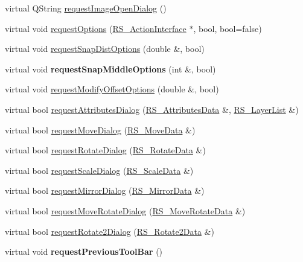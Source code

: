 \begin{DoxyCompactItemize}
\item 
virtual Q\-String \hyperlink{classRS__DialogFactoryAdapter_a6a8b801ae386148a8334aadc9cd93bf0}{request\-Image\-Open\-Dialog} ()
\item 
virtual void \hyperlink{classRS__DialogFactoryAdapter_a333c5316e39ba598f785b0fdbf70a197}{request\-Options} (\hyperlink{classRS__ActionInterface}{R\-S\-\_\-\-Action\-Interface} $\ast$, bool, bool=false)
\item 
virtual void \hyperlink{classRS__DialogFactoryAdapter_aa3eecd7f929f194fb0e21535dc71bb51}{request\-Snap\-Dist\-Options} (double \&, bool)
\item 
\hypertarget{classRS__DialogFactoryAdapter_a27040b164fe50a9e721c60d72700ab45}{virtual void {\bfseries request\-Snap\-Middle\-Options} (int \&, bool)}\label{classRS__DialogFactoryAdapter_a27040b164fe50a9e721c60d72700ab45}

\item 
virtual void \hyperlink{classRS__DialogFactoryAdapter_a3c1e41b03b44e5410959e96f7e086082}{request\-Modify\-Offset\-Options} (double \&, bool)
\item 
virtual bool \hyperlink{classRS__DialogFactoryAdapter_a01a1b0cdc86c5d5fa55be2a6632fb212}{request\-Attributes\-Dialog} (\hyperlink{classRS__AttributesData}{R\-S\-\_\-\-Attributes\-Data} \&, \hyperlink{classRS__LayerList}{R\-S\-\_\-\-Layer\-List} \&)
\item 
virtual bool \hyperlink{classRS__DialogFactoryAdapter_a419586ba96c245353b3a3565fbfe61b8}{request\-Move\-Dialog} (\hyperlink{classRS__MoveData}{R\-S\-\_\-\-Move\-Data} \&)
\item 
virtual bool \hyperlink{classRS__DialogFactoryAdapter_ae0ccbc43e73e2b1b5a9b69d8b492ba4f}{request\-Rotate\-Dialog} (\hyperlink{classRS__RotateData}{R\-S\-\_\-\-Rotate\-Data} \&)
\item 
virtual bool \hyperlink{classRS__DialogFactoryAdapter_a61768f6e1ccde00c2fd5d0c6e619dd45}{request\-Scale\-Dialog} (\hyperlink{classRS__ScaleData}{R\-S\-\_\-\-Scale\-Data} \&)
\item 
virtual bool \hyperlink{classRS__DialogFactoryAdapter_a16fbe8521795782f82a6ae63e402d041}{request\-Mirror\-Dialog} (\hyperlink{classRS__MirrorData}{R\-S\-\_\-\-Mirror\-Data} \&)
\item 
virtual bool \hyperlink{classRS__DialogFactoryAdapter_a6b907a204669dcdeb1225991d13d13a4}{request\-Move\-Rotate\-Dialog} (\hyperlink{classRS__MoveRotateData}{R\-S\-\_\-\-Move\-Rotate\-Data} \&)
\item 
virtual bool \hyperlink{classRS__DialogFactoryAdapter_ada3b55e971198b38bd4b18b9e6b5917d}{request\-Rotate2\-Dialog} (\hyperlink{classRS__Rotate2Data}{R\-S\-\_\-\-Rotate2\-Data} \&)
\item 
\hypertarget{classRS__DialogFactoryAdapter_a01706d6da74283e4e1b2a98b19ac1985}{virtual void {\bfseries request\-Previous\-Tool\-Bar} ()}\label{classRS__DialogFactoryAdapter_a01706d6da74283e4e1b2a98b19ac1985}


\end{DoxyCompactItemize}
